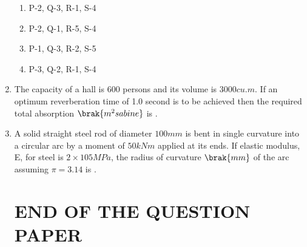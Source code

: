 \documentclass[journal,12pt,onecolumn]{IEEEtran}
\theoremstyle{remark}
\begin{document}
\begin{enumerate}
\hfill{}
\begin{enumerate}
\item P-2, Q-3, R-1, S-4
\item P-2, Q-1, R-5, S-4
\item P-1, Q-3, R-2, S-5
\item P-3, Q-2, R-1, S-4
\end{enumerate}

\item The capacity of a hall is 600 persons and its volume is $3000 cu.m$. If an optimum reverberation time of 1.0 second is to be achieved then the required total absorption $\brak{m^2 sabine}$ is \underline{\hspace{2cm}}.

\hfill{}

\item A solid straight steel rod of diameter $100 mm$ is bent in single curvature into a circular arc by a moment of $50 kNm$ applied at its ends. If elastic modulus, E, for steel is $2 \times 105 MPa$, the radius of curvature $\brak{mm}$ of the arc assuming $\pi=3.14$ is \underline{\hspace{2cm}}.

\hfill{}

\section*{END OF THE QUESTION PAPER}
\end{enumerate}
\end{document}
